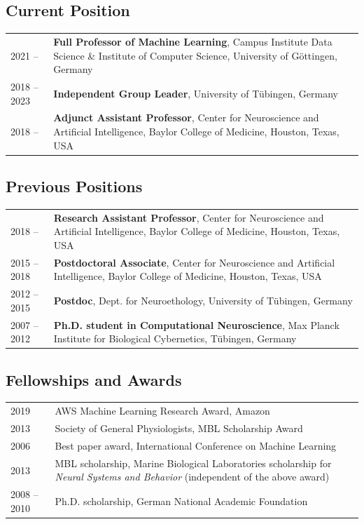 \documentclass[COG,11pt]{ercgrant}
\begin{document}
\subsection{Current Position}
\begin{tabular}{p{3cm}p{12cm}}
    2021 -- 
	 & \textbf{Full Professor of Machine Learning}, 
       Campus Institute Data Science \& Institute of Computer Science,
       University of Göttingen, Germany\\
    2018 -- 2023
      & \textbf{Independent Group Leader}, 
       University of Tübingen, Germany\\
    2018 -- 
      & \textbf{Adjunct Assistant Professor},
       Center for Neuroscience and Artificial Intelligence,
       Baylor College of Medicine, Houston, Texas, USA
\end{tabular}

\subsection{Previous Positions}
\begin{tabular}{p{3cm}p{12cm}}
    2018 -- 
      & \textbf{Research Assistant Professor},
       Center for Neuroscience and Artificial Intelligence, 
       Baylor College of Medicine, Houston, Texas, USA\\
    2015 -- 2018 
      & \textbf{Postdoctoral Associate},
       Center for Neuroscience and Artificial Intelligence,
       Baylor College of Medicine, Houston, Texas, USA\\
    2012 -- 2015 
      & \textbf{Postdoc},
       Dept. for Neuroethology, 
       University of Tübingen, Germany\\
    2007 -- 2012 
      & \textbf{Ph.D. student in Computational Neuroscience}, Max Planck Institute for Biological Cybernetics, Tübingen, Germany\\
\end{tabular}
\color{black}

\subsection{Fellowships and Awards}
\begin{tabular}{p{3cm}p{12cm}}
2019 & AWS Machine Learning Research Award, Amazon\\
2013 & Society of General Physiologists, MBL Scholarship Award\\
2006 & Best paper award, International Conference on Machine Learning\\
2013 & MBL scholarship, Marine Biological Laboratories
  scholarship for {\em Neural Systems and Behavior} (independent of the above award)\\
2008 -- 2010 & Ph.D. scholarship, German National Academic Foundation
\end{tabular}
\end{document}
